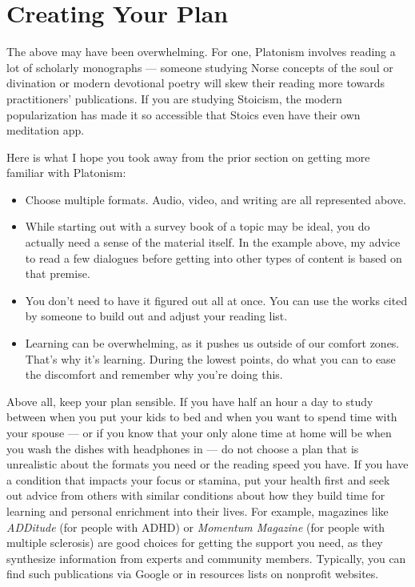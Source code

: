 \documentclass[
]{book}
\providecommand{\tightlist}{%
  \setlength{\itemsep}{0pt}\setlength{\parskip}{0pt}}
\begin{document}
\hypertarget{creating-your-plan}{%
\section{Creating Your Plan}\label{creating-your-plan}}

The above may have been overwhelming. For one, Platonism involves reading a lot of scholarly monographs --- someone studying Norse concepts of the soul or divination or modern devotional poetry will skew their reading more towards practitioners' publications. If you are studying Stoicism, the modern popularization has made it so accessible that Stoics even have their own meditation app.

Here is what I hope you took away from the prior section on getting more familiar with Platonism:

\begin{itemize}
\tightlist
\item
  Choose multiple formats. Audio, video, and writing are all represented above.
\item
  While starting out with a survey book of a topic may be ideal, you do actually need a sense of the material itself. In the example above, my advice to read a few dialogues before getting into other types of content is based on that premise.
\item
  You don't need to have it figured out all at once. You can use the works cited by someone to build out and adjust your reading list.
\item
  Learning can be overwhelming, as it pushes us outside of our comfort zones. That's why it's learning. During the lowest points, do what you can to ease the discomfort and remember why you're doing this.
\end{itemize}

Above all, keep your plan sensible. If you have half an hour a day to study between when you put your kids to bed and when you want to spend time with your spouse --- or if you know that your only alone time at home will be when you wash the dishes with headphones in --- do not choose a plan that is unrealistic about the formats you need or the reading speed you have. If you have a condition that impacts your focus or stamina, put your health first and seek out advice from others with similar conditions about how they build time for learning and personal enrichment into their lives. For example, magazines like \emph{ADDitude} (for people with ADHD) or \emph{Momentum Magazine} (for people with multiple sclerosis) are good choices for getting the support you need, as they synthesize information from experts and community members. Typically, you can find such publications via Google or in resources lists on nonprofit websites.
\end{document}

